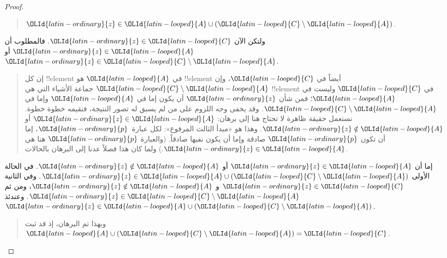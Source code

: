 \documentclass[../../../include/open-logic-section]{subfiles}
\begin{document}
\begin{proof}
\begin{quote}
    ${\OLId{latin-ordinary}{z}} \in {\OLId{latin-looped}{A}} \cup ({\OLId{latin-looped}{C}} \setminus {\OLId{latin-looped}{A}})$.
  \end{quote}
  ولتكن الآن ${\OLId{latin-ordinary}{z}} \in {\OLId{latin-looped}{C}}$. فالمطلوب أن ${\OLId{latin-ordinary}{z}} \in {\OLId{latin-looped}{A}}$ أو
  ${\OLId{latin-ordinary}{z}} \in {\OLId{latin-looped}{C}} \setminus {\OLId{latin-looped}{A}}$.
  \begin{quote}
    إن كل !!{element} في ${\OLId{latin-looped}{A}}$ هو !!{element} أيضاً في ${\OLId{latin-looped}{C}}$، وإن
    ${\OLId{latin-looped}{C}} \setminus {\OLId{latin-looped}{A}}$ جماعة الأشياء التي هي !!{element} في ${\OLId{latin-looped}{C}}$ وليست
    في ${\OLId{latin-looped}{A}}$؛ فمن شأن ${\OLId{latin-ordinary}{z}}$ أن يكون إما في ${\OLId{latin-looped}{A}}$ وإما في
    ${\OLId{latin-looped}{C}} \setminus {\OLId{latin-looped}{A}}$. وقد يخفى وجه اللزوم على من لم يسبق له تصور
    النتيجة، فنقيمه خطوة خطوة. نستعمل حقيقة ظاهرة لا تحتاج هنا إلى
    برهان: ${\OLId{latin-ordinary}{z}} \in {\OLId{latin-looped}{A}}$ أو ${\OLId{latin-ordinary}{z}} \notin {\OLId{latin-looped}{A}}$. وهذا هو «مبدأ الثالث المرفوع»:
    لكل عبارة~${\OLId{latin-ordinary}{p}}$، إما أن تكون ${\OLId{latin-ordinary}{p}}$ صادقة وإما أن يكون نفيها صادقاً.
    (والعبارة ${\OLId{latin-ordinary}{p}}$ هنا هي ${\OLId{latin-ordinary}{z}} \in {\OLId{latin-looped}{A}}$.) ولما كان هذا فصلاً عدنا إلى
    البرهان بالحالات.
  \end{quote}
  إما أن ${\OLId{latin-ordinary}{z}} \in {\OLId{latin-looped}{A}}$ أو ${\OLId{latin-ordinary}{z}} \notin {\OLId{latin-looped}{A}}$. في الحالة الأولى
  ${\OLId{latin-ordinary}{z}} \in {\OLId{latin-looped}{A}} \cup ({\OLId{latin-looped}{C}} \setminus {\OLId{latin-looped}{A}})$. وفي الثانية ${\OLId{latin-ordinary}{z}} \in {\OLId{latin-looped}{C}}$ و
  ${\OLId{latin-ordinary}{z}} \notin {\OLId{latin-looped}{A}}$، ومن ثم ${\OLId{latin-ordinary}{z}} \in {\OLId{latin-looped}{C}} \setminus {\OLId{latin-looped}{A}}$. وعندئذ
  ${\OLId{latin-ordinary}{z}} \in {\OLId{latin-looped}{A}} \cup ({\OLId{latin-looped}{C}} \setminus {\OLId{latin-looped}{A}})$.
  \begin{quote}
    وبهذا تم البرهان، إذ قد ثبت ${\OLId{latin-looped}{A}} \cup ({\OLId{latin-looped}{C}} \setminus {\OLId{latin-looped}{A}}) = {\OLId{latin-looped}{C}}$.
  \end{quote}
\end{proof}
\end{document}
